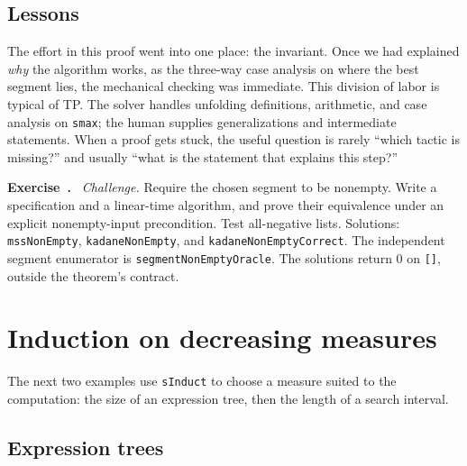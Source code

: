 \documentclass[review]{jfp-epi}
\newcommand{\code}[1]{\texttt{#1}}
\newcounter{exercise}
\newenvironment{exercise}{\refstepcounter{exercise}\par\medskip\noindent
  \textbf{Exercise~\theexercise.}\ }{\par\medskip}
\begin{document}
\subsection{Lessons}

The effort in this proof went into one place: the invariant. Once we had
explained \emph{why} the algorithm works, as the three-way case analysis on where
the best segment lies, the mechanical checking was immediate. This division of
labor is typical of TP. The solver handles unfolding definitions, arithmetic,
and case analysis on \code{smax}; the human supplies generalizations and
intermediate statements. When a proof gets stuck, the useful question is
rarely ``which tactic is missing?'' and usually ``what is the statement that
explains this step?''

\begin{exercise}
\emph{Challenge.} Require the chosen segment to be nonempty. Write a
specification and a linear-time algorithm, and prove their equivalence under
an explicit nonempty-input precondition. Test all-negative lists.
Solutions: \code{mssNonEmpty}, \code{kadaneNonEmpty}, and
\code{kadaneNonEmpty\allowbreak Correct}. The independent segment enumerator is
\code{segmentNonEmpty\allowbreak Oracle}. The solutions return 0 on \code{[]}, outside the theorem's contract.
\end{exercise}

\section{Induction on decreasing measures}
\label{sec:datatype-induction}

The next two examples use \code{sInduct} to choose a measure suited to the
computation: the size of an expression tree, then the length of a search interval.

\subsection{Expression trees}
\end{document}

